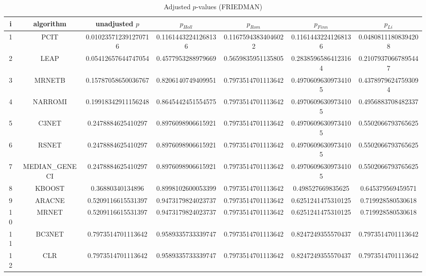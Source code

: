 \documentclass[a4paper,10pt]{article}
\begin{document}
\begin{landscape}
\begin{table}[!htp]
\centering\scriptsize
\caption{Adjusted $p$-values (FRIEDMAN)}
\begin{tabular}{ccccccc}
i&algorithm&unadjusted $p$&$p_{Holl}$&$p_{Rom}$&$p_{Finn}$&$p_{Li}$\\
\hline
1&PCIT&0.010235712391270716&0.11614432241268136&0.11675943834046022&0.11614432241268136&0.04808111808394208\\
2&LEAP&0.05412657644747054&0.4577953288979669&0.5659835951135805&0.28385965864123164&0.21079370667895447\\
3&MRNETB&0.15787058650036767&0.8206140749409951&0.7973514701113642&0.49706096309734105&0.43789796247593094\\
4&NARROMI&0.19918342911156248&0.8645442451554575&0.7973514701113642&0.49706096309734105&0.4956883708482337\\
5&C3NET&0.2478884625410297&0.8976098906615921&0.7973514701113642&0.49706096309734105&0.5502066793765625\\
6&RSNET&0.2478884625410297&0.8976098906615921&0.7973514701113642&0.49706096309734105&0.5502066793765625\\
7&MEDIAN_GENECI&0.2478884625410297&0.8976098906615921&0.7973514701113642&0.49706096309734105&0.5502066793765625\\
8&KBOOST&0.36880340134896&0.8998102600053399&0.7973514701113642&0.498527669835625&0.645379569459571\\
9&ARACNE&0.5209116615531397&0.9473179824023737&0.7973514701113642&0.6251241475310125&0.719928580530618\\
10&MRNET&0.5209116615531397&0.9473179824023737&0.7973514701113642&0.6251241475310125&0.719928580530618\\
11&BC3NET&0.7973514701113642&0.9589335733339747&0.7973514701113642&0.8247249355570437&0.7973514701113642\\
12&CLR&0.7973514701113642&0.9589335733339747&0.7973514701113642&0.8247249355570437&0.7973514701113642\\
\hline
\end{tabular}
\end{table}


\newpage


\end{landscape}
\end{document}
